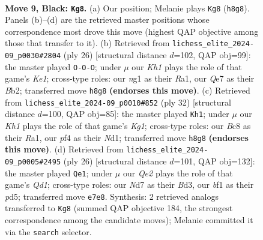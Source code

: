 \documentclass[11pt]{article}
\begin{document}
\clearpage

\begin{figure}[p]\centering
\begin{subfigure}{0.46\textwidth}\centering
\resizebox{\linewidth}{!}{%
\newchessgame
\chessboard[
  setfen={rnb2r1k/pppnqppp/4p3/3pP2Q/3P1P2/2N5/PPP3PP/R3KBNR b KQ - 4 9},
  showmover=false,
  pgfstyle=straightmove, color=movearrow, markmove={h8-g8}
]}
\caption{}
\end{subfigure}\hfill
\begin{subfigure}{0.46\textwidth}\centering
\resizebox{\linewidth}{!}{%
\newchessgame
\chessboard[
  setfen={rn3rk1/ppp2pp1/4p1bp/4P3/4p1Pq/1P2P2P/PBPNQP2/R3K2R w KQ - 3 14},
  showmover=false,
  pgfstyle=straightmove, color=movearrow, markmove={e1-c1}
]}
\caption{}
\end{subfigure}
\\[4pt]
\begin{subfigure}{0.46\textwidth}\centering
\resizebox{\linewidth}{!}{%
\newchessgame
\chessboard[
  setfen={r1bb1rk1/pp4pn/2pp2qp/P3p3/4P3/3P3P/P1PBQPPN/R2NR1K1 w - - 4 17},
  showmover=false,
  pgfstyle=straightmove, color=movearrow, markmove={g1-h1}
]}
\caption{}
\end{subfigure}\hfill
\begin{subfigure}{0.46\textwidth}\centering
\resizebox{\linewidth}{!}{%
\newchessgame
\chessboard[
  setfen={r3k2r/pp1b3p/1qn1pp1b/3p4/1P1P4/P2BPN2/6PP/RN1Q1RK1 w kq - 2 14},
  showmover=false,
  pgfstyle=straightmove, color=movearrow, markmove={d1-e1}
]}
\caption{}
\end{subfigure}
\caption{\textbf{Move 9, Black: \texttt{Kg8}.} (a) Our position; Melanie plays \texttt{Kg8} (\texttt{h8g8}). Panels (b)--(d) are the retrieved master positions whose correspondence most drove this move (highest QAP objective among those that transfer to it). (b) Retrieved from \texttt{lichess\_elite\_2024-09\_p0030\#2804} (ply 26) [structural distance $d$=102, QAP obj=99]: the master played \texttt{O-O-O}; under $\mu$ our \emph{Kh1} plays the role of that game's \emph{Ke1}; cross-type roles: our \emph{n}g1 as their \emph{R}a1, our \emph{Q}e7 as their \emph{B}b2; transferred move \texttt{h8g8} \textbf{(endorses this move)}. (c) Retrieved from \texttt{lichess\_elite\_2024-09\_p0010\#852} (ply 32) [structural distance $d$=100, QAP obj=85]: the master played \texttt{Kh1}; under $\mu$ our \emph{Kh1} plays the role of that game's \emph{Kg1}; cross-type roles: our \emph{B}c8 as their \emph{R}a1, our \emph{p}f4 as their \emph{N}d1; transferred move \texttt{h8g8} \textbf{(endorses this move)}. (d) Retrieved from \texttt{lichess\_elite\_2024-09\_p0005\#2495} (ply 26) [structural distance $d$=101, QAP obj=132]: the master played \texttt{Qe1}; under $\mu$ our \emph{Qe2} plays the role of that game's \emph{Qd1}; cross-type roles: our \emph{N}d7 as their \emph{B}d3, our \emph{b}f1 as their \emph{p}d5; transferred move \texttt{e7e8}. Synthesis: 2 retrieved analogs transferred to \texttt{Kg8} (summed QAP objective 184, the strongest correspondence among the candidate moves); Melanie committed it via the \texttt{search} selector.}
\label{fig:thought-m17}
\end{figure}
\end{document}
